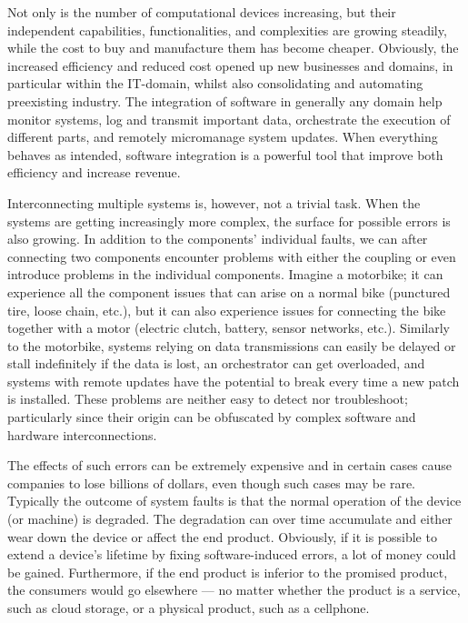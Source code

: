 Not only is the number of computational devices increasing, but their independent capabilities, functionalities, and complexities are growing steadily, while the cost to buy and manufacture them has become cheaper.
Obviously, the increased efficiency and reduced cost opened up new businesses and domains, in particular within the IT-domain, whilst also consolidating and automating preexisting industry.
The integration of software in generally any domain help monitor systems, log and transmit important data, orchestrate the execution of different parts, and remotely micromanage system updates.
When everything behaves as intended, software integration is a powerful tool that improve both efficiency and increase revenue.


Interconnecting multiple systems is, however, not a trivial task.
When the systems are getting increasingly more complex, the surface for possible errors is also growing.
In addition to the components' individual faults, we can after connecting two components encounter problems with either the coupling or even introduce problems in the individual components.
Imagine a motorbike; it can experience all the component issues that can arise on a normal bike (punctured tire, loose chain, etc.), but it can also experience issues for connecting the bike together with a motor (electric clutch, battery, sensor networks, etc.).
Similarly to the motorbike, systems relying on data transmissions can easily be delayed or stall indefinitely if the data is lost, an orchestrator can get overloaded, and systems with remote updates have the potential to break every time a new patch is installed.
These problems are neither easy to detect nor troubleshoot; particularly since their origin can be obfuscated by complex software and hardware interconnections.

The effects of such errors can be extremely expensive and in certain cases cause companies to lose billions of dollars, even though such cases may be rare.
Typically the outcome of system faults is that the normal operation of the device (or machine) is degraded.
The degradation can over time accumulate and either wear down the device or affect the end product.
Obviously, if it is possible to extend a device's lifetime by fixing software-induced errors, a lot of money could be gained.
Furthermore, if the end product is inferior to the promised product, the consumers would go elsewhere --- no matter whether the product is a service, such as cloud storage, or a physical product, such as a cellphone.

